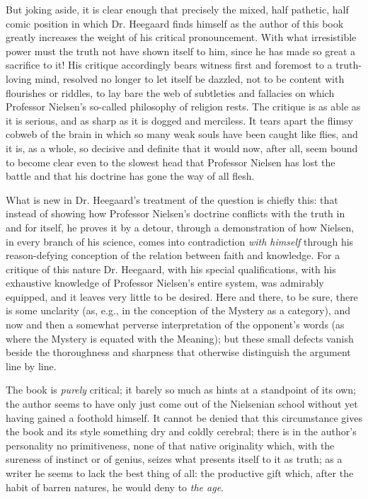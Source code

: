 \documentclass[12pt,a4paper,openany]{book}
\newcommand{\opage}[1]{\marginnote{\footnotesize\textit{[#1]}}}
\begin{document}
But joking aside, it is clear enough that precisely the mixed,
half pathetic, half comic position in which Dr. Heegaard finds
himself as the author of this book greatly increases the weight
of his critical pronouncement. With what irresistible power must
the truth not have shown itself to him, since
he has made so great a sacrifice to it! His critique accordingly
bears witness first and foremost to a truth-loving mind, resolved
no longer to let itself be dazzled, not to be content with
flourishes or riddles, to lay bare the web of subtleties and
fallacies on which Professor Nielsen's so-called philosophy of
religion rests. The critique is as able as it is serious, and as
sharp as it is dogged
\opage{108}and merciless. It tears apart the flimsy cobweb of the brain in
which so many weak souls have been caught like flies, and it is,
as a whole, so decisive and definite that it would now, after all, seem bound to
become clear even to the slowest head that Professor Nielsen has
lost the battle and that his doctrine has gone the way of all
flesh.

What is new in Dr. Heegaard's treatment of the question is chiefly
this: that instead of showing how Professor Nielsen's doctrine
conflicts with the truth in and for itself, he proves it by a
detour, through a demonstration of how Nielsen, in every branch
of his science, comes into contradiction \emph{with himself}
through his reason-defying conception of the relation between
faith and knowledge. For a critique of this nature Dr. Heegaard,
with his special qualifications, with his exhaustive knowledge of
Professor Nielsen's entire system, was admirably equipped, and it
leaves very little to be desired. Here and there, to be sure,
there is some unclarity (as, e.g., in the conception of the
Mystery as a category), and now and then a somewhat perverse
interpretation of the opponent's words (as where the Mystery is
equated with the Meaning); but these small defects vanish beside
the thoroughness and sharpness that otherwise distinguish the
argument line by line.

The book is \emph{purely} critical; it barely so much as hints at
a standpoint of its own; the author seems to have only just come
out of the Nielsenian school without yet having gained a
foothold himself. It cannot be denied that this circumstance
gives the book and its style something dry and coldly cerebral;
there is in the author's personality no primitiveness, none of
that native originality which, with the sureness of instinct or
of genius, seizes what presents itself to it as truth; as a
writer he seems to lack the best thing of all: the productive
gift which, after the habit of barren natures, he would deny to
\emph{the age}.
\end{document}
